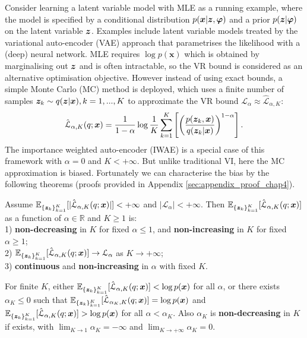 Consider learning a latent variable model with MLE as a running example, where the model is specified by a conditional distribution $p(\bm{x}|\bm{z}, \bm{\varphi})$ and a prior $p(\bm{z}| \bm{\varphi})$ on the latent variable $\bm{z}$. Examples include latent variable models treated by the variational auto-encoder (VAE) approach \citep{kingma:vae2014, rezende:vae2014} that parametrises the likelihood with a (deep) neural network. MLE requires $\log p(\bm{x})$ which is obtained by marginalising out $\bm{z}$ and is often intractable, so the VR bound is considered as an alternative optimisation objective. However instead of using exact bounds, a simple Monte Carlo (MC) method is deployed, which uses a finite number of samples $\bm{z}_k \sim q(\bm{z}|\bm{x}), k = 1, ..., K$ to approximate the VR bound $\mathcal{L}_{\alpha} \approx \hat{\mathcal{L}}_{\alpha, K}$:
\begin{equation}
\label{eq:sampling_estimate}
\hat{\mathcal{L}}_{\alpha, K}(q; \bm{x}) = \frac{1}{1 - \alpha} \log \frac{1}{K} \sum_{k=1}^K \left[\left( \frac{p(\bm{z}_k, \bm{x})}{q(\bm{z}_k|\bm{x})} \right)^{1 - \alpha} \right].
\end{equation}
The importance weighted auto-encoder (IWAE) \citep{burda:iwae2016} is a special case of this framework with $\alpha = 0$ and $K < +\infty$. But unlike traditional VI, here the MC approximation is biased. Fortunately we can characterise the bias by the following theorems (proofs provided in Appendix \ref{sec:appendix_proof_chap4}).
%
%
\begin{theorem}
\label{thm:chap4_vrbound_sampling_bound}
Assume $\mathbb{E}_{\{\bm{z}_k\}_{k=1}^K} [ |\hat{\mathcal{L}}_{\alpha, K}(q; \bm{x})| ] < + \infty$ and $|\mathcal{L}_{\alpha}| < +\infty$. Then $\mathbb{E}_{\{\bm{z}_k\}_{k=1}^K} [ \hat{\mathcal{L}}_{\alpha, K}(q; \bm{x}) ]$ as a function of $\alpha \in \mathbb{R}$ and $K \geq 1$ is: \\
1) \textbf{non-decreasing} in $K$ for fixed $\alpha \leq 1$, and \textbf{non-increasing} in $K$ for fixed $\alpha \geq 1$; \\
2) $\mathbb{E}_{\{\bm{z}_k\}_{k=1}^K} [ \hat{\mathcal{L}}_{\alpha, K}(q; \bm{x}) ] \rightarrow \mathcal{L}_{\alpha}$ as $K \rightarrow +\infty$; \\
3) \textbf{continuous} and \textbf{non-increasing} in $\alpha$ with fixed $K$.
\end{theorem}

\begin{corollary}
\label{thm:chap4_vrbound_alpha_k_existence}
For finite $K$, either $\mathbb{E}_{\{\bm{z}_k\}_{k=1}^K} [ \hat{\mathcal{L}}_{\alpha, K}(q; \bm{x}) ] < \log p(\bm{x})$ for all $\alpha$, or there exists $\alpha_K \leq 0$ such that $\mathbb{E}_{\{\bm{z}_k\}_{k=1}^K} [ \hat{\mathcal{L}}_{\alpha_K, K}(q; \bm{x}) ] = \log p(\bm{x})$ and $\mathbb{E}_{\{\bm{z}_k\}_{k=1}^K} [ \hat{\mathcal{L}}_{\alpha, K}(q; \bm{x}) ] > \log p(\bm{x})$ for all $\alpha < \alpha_K$. Also $\alpha_K$ is \textbf{non-decreasing} in $K$ if exists, with $\lim_{K \rightarrow 1} \alpha_K = -\infty$ and $\lim_{K \rightarrow +\infty} \alpha_K = 0$.
\end{corollary}

